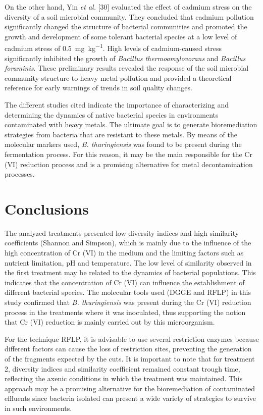 \documentclass{univsciauth}
\begin{document}
On the other hand, Yin \emph{et al.} {[}30{]} evaluated the effect of
cadmium stress on the diversity of a soil microbial community. They
concluded that cadmium pollution significantly changed the structure of
bacterial communities and promoted the growth and development of some
tolerant bacterial species at a low level of cadmium stress of \SI{0.5}{mg.kg^{-1}}.
High levels of cadmium-caused stress significantly inhibited the
growth of \emph{Bacillus thermoamylovorans} and \emph{Bacillus
foraminis}. These preliminary results revealed the response of the soil
microbial community structure to heavy metal pollution and provided a
theoretical reference for early warnings of trends in soil quality
changes.

The different studies cited indicate the importance of characterizing
and determining the dynamics of native bacterial species in environments
contaminated with heavy metals. The ultimate goal is to generate
bioremediation strategies from bacteria that are resistant to these
metals. By means of the molecular markers used, \emph{B. thuringiensis}
was found to be present during the fermentation process. For this
reason, it may be the main responsible for the Cr (VI) reduction process
and is a promising alternative for metal decontamination processes.

\section{Conclusions}

The analyzed treatments presented low diversity indices and high
similarity coefficients (Shannon and Simpson), which is mainly due to
the influence of the high concentration of Cr (VI) in the medium and the
limiting factors such as nutrient limitation, pH and temperature. The
low level of similarity observed in the first treatment may be related
to the dynamics of bacterial populations. This indicates that the
concentration of Cr (VI) can influence the establishment of different
bacterial species. The molecular tools used (DGGE and RFLP) in this
study confirmed that \emph{B. thuringiensis} was present during the Cr
(VI) reduction process in the treatments where it was inoculated, thus
supporting the notion that Cr (VI) reduction is mainly carried out by
this microorganism.

For the technique RFLP, it is advisable to use several restriction
enzymes because different factors can cause the loss of restriction
sites, preventing the generation of the fragments expected by the cuts.
It is important to note that for treatment 2, diversity indices and
similarity coefficient remained constant trough time, reflecting the
axenic conditions in which the treatment was maintained. This approach
may be a promising alternative for the bioremediation of contaminated
effluents since bacteria isolated can present a wide variety of
strategies to survive in such environments.
\end{document}
